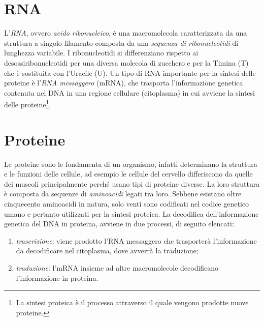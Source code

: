 \section{RNA}
L'\textit{RNA}, ovvero \textit{acido ribonucleico}, è una macromolecola caratterizzata da una struttura a singolo filamento composta da una \textit{sequenza di ribonucleotidi} di lunghezza variabile.
\newline
I ribonucleotidi si differenziano rispetto ai desossiribonucleotidi per una diversa molecola di zucchero e per la Timina (T) che è sostituita con l'Uracile (U).
\newline
Un tipo di RNA importante per la sintesi delle proteine è l'\textit{RNA messaggero} (mRNA), che trasporta l'informazione genetica contenuta nel DNA in una regione cellulare (citoplasma) in cui avviene la sintesi delle proteine\footnote{La sintesi proteica è il processo attraverso il quale vengono prodotte nuove proteine.}.

\section{Proteine}
Le proteine sono le fondamenta di un organismo, infatti determinano la struttura e le funzioni delle cellule, ad esempio le cellule del cervello differiscono da quelle dei muscoli principalmente perché usano tipi di proteine diverse.
La loro struttura è composta da sequenze di \textit{aminoacidi} legati tra loro.
\newline
Sebbene esistano oltre cinquecento aminoacidi in natura, solo venti sono codificati nel codice genetico umano e pertanto utilizzati per la sintesi proteica.
\newline
La decodifica dell'informazione genetica del DNA in proteina, avviene in due processi, di seguito elencati:
\begin{enumerate}
	\item \textit{trascrizione}: viene prodotto l'RNA messaggero che trasporterà l'informazione da decodificare nel citoplasma, dove avverrà la traduzione;
	\item \textit{traduzione}: l'mRNA insieme ad altre macromolecole decodificano l'informazione in proteina.
\end{enumerate}